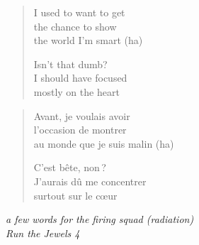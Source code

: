 \clearpage\thispagestyle{empty}\vspace*{\fill}

\begin{verse}
I used to want to get \\
the chance to show \\
the world I'm smart (ha)

Isn't that dumb? \\
I should have focused \\
mostly on the heart
\end{verse}
\begin{verse}\small
Avant, je voulais avoir \\
l'occasion de montrer \\
au monde que je suis malin (ha)

C'est bête, non\,? \\
J'aurais dû me concentrer \\
surtout sur le cœur
\end{verse}
\begin{flushright}\small\itshape
a few words for the firing squad (radiation) \\
Run the Jewels 4
\end{flushright}

\vspace*{\fill}\clearpage
